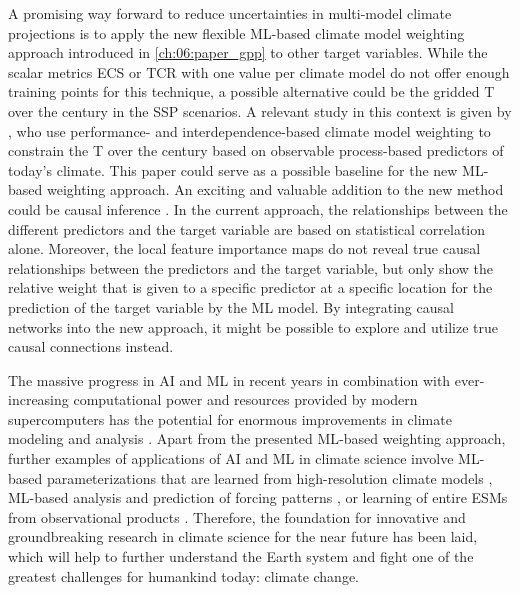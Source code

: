 A promising way forward to reduce uncertainties in multi-model climate
projections is to apply the new flexible \acs{ML}-based climate model weighting
approach introduced in \cref{ch:06:paper_gpp} to other target variables. While
the scalar metrics \ac{ECS} or \ac{TCR} with one value per climate model do not
offer enough training points for this technique, a possible alternative could
be the gridded \acl{T} over the  century in the \ac{SSP} scenarios. A
relevant study in this context is given by \textcite{Brunner2020}, who use
performance- and interdependence-based climate model weighting to constrain the
\acl{T} over the  century based on observable process-based predictors
of today's climate. This paper could serve as a possible baseline for the new
\acs{ML}-based weighting approach. An exciting and valuable addition to the new
method could be causal inference \autocite{Nowack2020, Runge2019}. In the
current approach, the relationships between the different predictors and the
target variable are based on statistical correlation alone. Moreover, the local
feature importance maps do not reveal true causal relationships between the
predictors and the target variable, but only show the relative weight that is
given to a specific predictor at a specific location for the prediction of the
target variable by the \ac{ML} model. By integrating causal networks into the
new approach, it might be possible to explore and utilize true causal
connections instead.

The massive progress in \ac{AI} and \ac{ML} in recent years in combination with
ever-increasing computational power and resources provided by modern
supercomputers has the potential for enormous improvements in climate modeling
and analysis \autocite{Reichstein2019}. Apart from the presented \acs{ML}-based
weighting approach, further examples of applications of \ac{AI} and \ac{ML} in
climate science involve \acs{ML}-based parameterizations that are learned from
high-resolution climate models \autocite{Gentine2018, Rasp2018}, \acs{ML}-based
analysis and prediction of forcing patterns \autocite{Barnes2019,
  Mansfield2020}, or learning of entire \acp{ESM} from observational products
\autocite{Geer2021}. Therefore, the foundation for innovative and
groundbreaking research in climate science for the near future has been laid,
which will help to further understand the Earth system and fight one of the
greatest challenges for humankind today: climate change.
